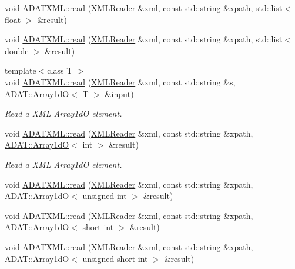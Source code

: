 \begin{DoxyCompactItemize}
\item 
void \mbox{\hyperlink{group__io_ga1a4d06e4f08869c717ad7db1a8fbfa2f}{A\+D\+A\+T\+X\+M\+L\+::read}} (\mbox{\hyperlink{classADATXML_1_1XMLReader}{X\+M\+L\+Reader}} \&xml, const std\+::string \&xpath, std\+::list$<$ float $>$ \&result)
\item 
void \mbox{\hyperlink{group__io_ga8feeff4a74f8b53707756dc206808983}{A\+D\+A\+T\+X\+M\+L\+::read}} (\mbox{\hyperlink{classADATXML_1_1XMLReader}{X\+M\+L\+Reader}} \&xml, const std\+::string \&xpath, std\+::list$<$ double $>$ \&result)
\item 
{\footnotesize template$<$class T $>$ }\\void \mbox{\hyperlink{group__io_gaba638604c3a98bce5724245a7fad4055}{A\+D\+A\+T\+X\+M\+L\+::read}} (\mbox{\hyperlink{classADATXML_1_1XMLReader}{X\+M\+L\+Reader}} \&xml, const std\+::string \&s, \mbox{\hyperlink{classADAT_1_1Array1dO}{A\+D\+A\+T\+::\+Array1dO}}$<$ T $>$ \&input)
\begin{DoxyCompactList}\small\item\em Read a X\+ML Array1dO element. \end{DoxyCompactList}\item 
void \mbox{\hyperlink{group__io_ga1f304041cae2cc81ec6bd79e94a0f7dd}{A\+D\+A\+T\+X\+M\+L\+::read}} (\mbox{\hyperlink{classADATXML_1_1XMLReader}{X\+M\+L\+Reader}} \&xml, const std\+::string \&xpath, \mbox{\hyperlink{classADAT_1_1Array1dO}{A\+D\+A\+T\+::\+Array1dO}}$<$ int $>$ \&result)
\begin{DoxyCompactList}\small\item\em Read a X\+ML Array1dO element. \end{DoxyCompactList}\item 
void \mbox{\hyperlink{group__io_ga1c554d7ca96ef05f2e5c8d92af1515b9}{A\+D\+A\+T\+X\+M\+L\+::read}} (\mbox{\hyperlink{classADATXML_1_1XMLReader}{X\+M\+L\+Reader}} \&xml, const std\+::string \&xpath, \mbox{\hyperlink{classADAT_1_1Array1dO}{A\+D\+A\+T\+::\+Array1dO}}$<$ unsigned int $>$ \&result)
\item 
void \mbox{\hyperlink{group__io_gaf12f0eb15652e228314c4a67e168688d}{A\+D\+A\+T\+X\+M\+L\+::read}} (\mbox{\hyperlink{classADATXML_1_1XMLReader}{X\+M\+L\+Reader}} \&xml, const std\+::string \&xpath, \mbox{\hyperlink{classADAT_1_1Array1dO}{A\+D\+A\+T\+::\+Array1dO}}$<$ short int $>$ \&result)
\item 
void \mbox{\hyperlink{group__io_gafcc468224ec7aadb6f062319ee4a9017}{A\+D\+A\+T\+X\+M\+L\+::read}} (\mbox{\hyperlink{classADATXML_1_1XMLReader}{X\+M\+L\+Reader}} \&xml, const std\+::string \&xpath, \mbox{\hyperlink{classADAT_1_1Array1dO}{A\+D\+A\+T\+::\+Array1dO}}$<$ unsigned short int $>$ \&result)

\end{DoxyCompactItemize}
